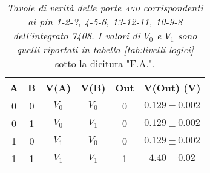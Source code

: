 \begin{table}[H]
  \vspace{.5cm}
  
  \begin{subtable}[H]{0.5\textwidth}
    \centering
    \begin{tabular}[t]{c  c | c  c | c  c}
      \hline
      A & B & V(A) & V(B) & Out & V(Out) (V)\\
      \hline
      0 & 0 & $V_{0}$ & $V_{0}$ & 0 & $0.129 \pm 0.002$ \\
      0 & 1 & $V_{0}$ & $V_{1}$ & 0 & $0.129 \pm 0.002$ \\
      1 & 0 & $V_{1}$ & $V_{0}$ & 0 & $0.129 \pm 0.002$ \\
      1 & 1 & $V_{1}$ & $V_{1}$ & 1 & $4.40 \pm 0.02$ \\
      \hline
    \end{tabular}
  \end{subtable}
  \caption{\emph{Tavole di verità delle porte \textsc{and} corrispondenti ai pin 1-2-3, 4-5-6, 13-12-11, 10-9-8 dell'integrato 7408. I valori di $V_{0}$ e $V_{1}$ sono quelli riportati in tabella \ref{tab:livelli-logici}} sotto la dicitura "F.A.".}
  \label{tab:and2-multiplexer}
\end{table}

